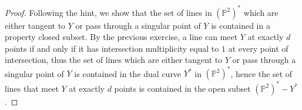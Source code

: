 \documentclass[12pt]{article}
\newcommand{\PP}{\mathbb{P}}
\theoremstyle{definition}
\begin{document}
\begin{enumerate} [label=\textbf{\arabic*.}, leftmargin=-0.05em]
\begin{proof}
  Following the hint, we show that the set of lines in $(\PP^2)^*$ which are either tangent to $Y$ or pass through a singular point of $Y$ is contained in a property closed subset. By the previous exercise, a line can meet $Y$ at exactly $d$ points if and only if it has intersection multiplicity equal to $1$ at every point of intersection, thus the set of lines which are either tangent to $Y$ or pass through a singular point of $Y$ is contained in the dual curve $Y^*$ in $(\PP^2)^*$, hence the set of lines that meet $Y$ at exactly $d$ points is contained in the open subset $(\PP^2)^* - Y^*$.
  
\end{proof}

\end{enumerate}
\end{document}
